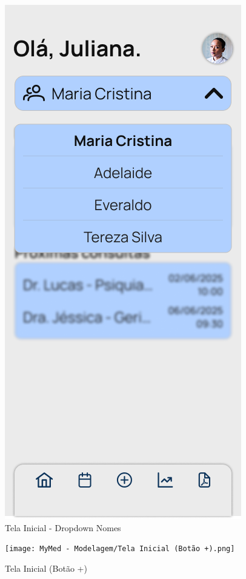 \begin{figure}[!htbp]
	\centering
	\includegraphics[width=0.6\linewidth]{MyMed - Modelagem/Tela Inicial - Dropdown Nomes.png}
	\caption{Tela Inicial - Dropdown Nomes}
	\label{tela_inicial_dropdown_nomes}
\end{figure}

\begin{figure}[!htbp]
	\centering
	\texttt{[image: MyMed - Modelagem/Tela Inicial (Botão +).png]}
	\caption{Tela Inicial (Botão +)}
	\label{tela_inicial_botao_mais}
\end{figure}

